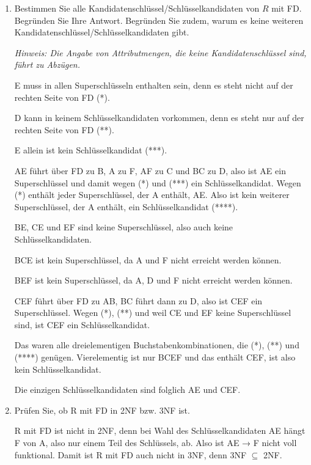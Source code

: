 \documentclass{lehramt-informatik-aufgabe}
\begin{document}
\begin{enumerate}


\item Bestimmen Sie alle Kandidatenschlüssel/Schlüsselkandidaten von $R$
mit FD. Begründen Sie Ihre Antwort. Begründen Sie zudem, warum es keine
weiteren Kandidatenschlüssel/Schlüsselkandidaten gibt.

\emph{Hinweis: Die Angabe von Attributmengen, die keine
Kandidatenschlüssel sind, führt zu Abzügen.}

\begin{liAntwort}
E muss in allen Superschlüsseln enthalten sein, denn es steht nicht auf
der rechten Seite von FD (*).

D kann in keinem Schlüsselkandidaten vorkommen, denn es steht nur auf
der rechten Seite von FD (**).

E allein ist kein Schlüsselkandidat (***).

AE führt über FD zu B, A zu F, AF zu C und BC zu D, also ist AE ein
Superschlüssel und damit wegen (*) und (***) ein Schlüsselkandidat.
Wegen (*) enthält jeder Superschlüssel, der A enthält, AE. Also ist kein
weiterer Superschlüssel, der A enthält, ein Schlüsselkandidat (****).

BE, CE und EF sind keine Superschlüssel, also auch keine
Schlüsselkandidaten.

BCE ist kein Superschlüssel, da A und F nicht erreicht werden können.

BEF ist kein Superschlüssel, da A, D und F nicht erreicht werden können.

CEF führt über FD zu AB, BC führt dann zu D, also ist CEF ein
Superschlüssel. Wegen (*), (**) und weil CE und EF keine Superschlüssel
sind, ist CEF ein Schlüsselkandidat.

Das waren alle dreielementigen Buchstabenkombinationen, die (*), (**)
und (****) genügen. Vierelementig ist nur BCEF und das enthält CEF, ist
also kein Schlüsselkandidat.

Die einzigen Schlüsselkandidaten sind folglich AE und CEF.
\end{liAntwort}


\item Prüfen Sie, ob R mit FD in 2NF bzw. 3NF ist.

\begin{liAntwort}
R mit FD ist nicht in 2NF, denn bei Wahl des Schlüsselkandidaten AE
hängt F von A, also nur einem Teil des Schlüssels, ab. Also ist AE → F
nicht voll funktional. Damit ist R mit FD auch nicht in 3NF, denn 3NF
$\subseteq$ 2NF.
\end{liAntwort}


\end{enumerate}
\end{document}
